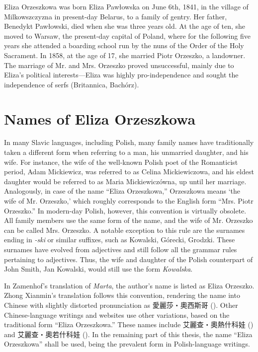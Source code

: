 Eliza Orzeszkowa was born Eliza Pawłowska on June 6th, 1841, in the village of Milkowszczyzna in present-day Belarus, to a family of gentry. Her father, Benedykt Pawłowski, died when she was three years old. 
At the age of ten, she moved to Warsaw, the present-day capital of Poland, where for the following five years she attended a boarding school run by the nuns of the Order of the Holy Sacrament.
In 1858, at the age of 17, she married Piotr Orzeszko, a landowner.
The marriage of Mr. and Mrs. Orzeszko proved unsuccessful, mainly due to Eliza's political interests---Eliza was highly pro-independence and sought the independence of serfs (Britannica, Bachórz).

\section{Names of Eliza Orzeszkowa}
In many Slavic languages, including Polish, many family names have traditionally taken a different form when referring to a man, his unmarried daughter, and his wife.
For instance, the wife of the well-known Polish poet of the Romanticist period, Adam Mickiewicz, was referred to as Celina Mickiewiczowa, and his eldest daughter would be referred to as Maria Mickiewiczówna, up until her marriage.
Analogously, in case of the name ``Eliza Orzeszkowa,'' Orzeszkowa means `the wife of Mr. Orzeszko,' which roughly corresponds to the English form ``Mrs. Piotr Orzeszko.''
In modern-day Polish, however, this convention is virtually obsolete.
All family members use the same form of the name, and the wife of Mr. Orzeszko can be called Mrs. Orzeszko.
A notable exception to this rule are the surnames ending in \textit{-ski} or similar suffixes, such as Kowalski, Górecki, Grodzki.
These surnames have evolved from adjectives and still follow all the grammar rules pertaining to adjectives.
Thus, the wife and daughter of the Polish counterpart of John Smith, Jan Kowalski, would still use the form \textit{Kowalska}. 

In Zamenhof's translation of \textit{Marta}, the author's name is listed as Eliza Orzeszko.
Zhong Xianmin's translation follows this convention, rendering the name into Chinese with slightly distorted pronunciation as 愛麗莎・奧西斯哥 ().
Other Chinese-language writings and websites use other variations, based on the traditional form ``Eliza Orzeszkowa.''
These names include 艾麗查・奧熱什科娃 () and 艾麗查・奧若什科娃 (). In the remaining part of this thesis, the name ``Eliza Orzeszkowa'' shall be used, being the prevalent form in Polish-language writings.

